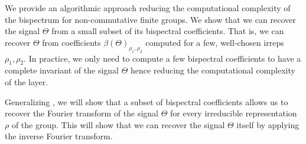 



We provide an algorithmic approach reducing the computational complexity of the bispectrum for non-commutative finite groups. We show that we can recover the signal $\Theta$ from a small subset of its bispectral coefficients. That is, we can recover $\Theta$ from coefficients $\beta (\Theta)_{\rho_1, \rho_2}$ computed for a few, well-chosen irreps $\rho_1, \rho_2$. In practice, we only need to compute a few bispectral coefficients to have a complete invariant of the signal $\Theta$ \textemdash hence reducing the computational complexity of the layer.

Generalizing \cite{KakaralaTriple}, we will show that a subset of bispectral coefficients allows us to recover the Fourier transform of the signal $\Theta$ for every irreducible representation $\rho$ of the group. This will show that we can recover the signal $\Theta$ itself by applying the inverse Fourier transform.



